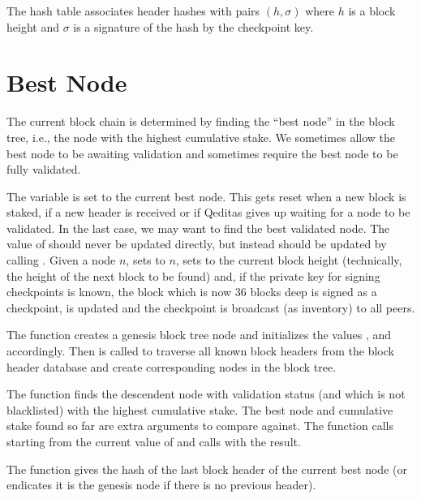 The hash table {} associates header hashes with pairs $(h,\sigma)$
where $h$ is a block height and $\sigma$ is a signature of the hash by the checkpoint key.

\section{Best Node}

The current block chain is determined by finding the ``best node''
in the block tree, i.e., the node with the highest cumulative stake.
We sometimes allow the best node to be awaiting validation and sometimes require the best node
to be fully validated.

The variable {} is set to the current best node.
This gets reset when a new block is staked, if a new header is received
or if Qeditas gives up waiting for a node to be validated.
In the last case, we may want to find the best validated node.
The value of {} should never be updated directly,
but instead should be updated by calling {}.
Given a node $n$, {} sets {} to $n$,
sets {} to the current block height (technically, the
height of the next block to be found)
and, if the private key for signing checkpoints is known, the block which
is now 36 blocks deep is signed as a checkpoint,
{} is updated
and the checkpoint is broadcast (as inventory) to all peers.

The function {} creates a genesis block tree node
and initializes the values
{},
{}
and {} accordingly.
Then {} is called to traverse all known block headers from
the block header database {}
and create corresponding nodes in the block tree.

The function {}
finds the descendent node with validation status {}
(and which is not blacklisted)
with the highest cumulative stake.
The best node and cumulative stake found so far are extra arguments to compare against.
The function {} calls {}
starting from the current value of {}
and calls {} with the result.

The function {} gives the hash of the last block header of the current best node (or endicates it is the genesis node if there is no previous header).

